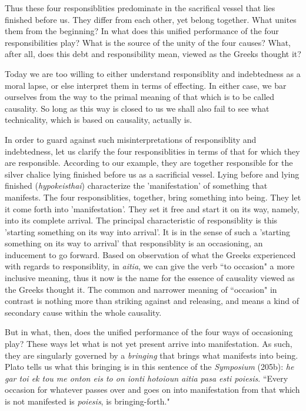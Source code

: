 \documentclass[12pt]{article}
\begin{document}
Thus these four responsiblities predominate in the sacrifical vessel that lies finished before us. They differ from each other, yet belong together. What unites them from the beginning? In what does this unified performance of the four responsibilities play? What is the source of the unity of the four causes? What, after all, does this debt and responsibility mean, viewed as the Greeks thought it? 

Today we are too willing to either understand responsiblity and indebtedness as a moral lapse, or else interpret them in terms of effecting. In either case, we bar ourselves from the way to the primal meaning of that which is to be called causality. So long as this way is closed to us we shall also fail to see what technicality, which is based on causality, actually is.

In order to guard against such misinterpretations of responsiblity and indebtedness, let us clarify the four responsiblities in terms of that for which they are responsible. According to our example, they are together responsible for the silver chalice lying finished before us as a sacrificial vessel. Lying before and lying finished (\textit{hypokeisthai}) characterize the 'manifestation' of something that manifests. The four responsiblities, together, bring something into being. They let it come forth into 'manifestation'. They set it free and start it on its way, namely, into its complete arrival. The principal characteristic of responsiblity is this 'starting something on its way into arrival'. It is in the sense of such a 'starting something on its way to arrival' that responsiblity is an occasioning, an inducement to go forward. Based on observation of what the Greeks experienced with regards to responsiblity, in \textit{aitia}, we can give the verb ``to occasion" a more inclusive meaning, thus it now is the name for the essence of causality viewed as the Greeks thought it. The common and narrower meaning of ``occasion" in contrast is nothing more than striking against and releasing, and means a kind of secondary cause within the whole causality.

But in what, then, does the unified performance of the four ways of occasioning play? These ways let what is not yet present arrive into manifestation. As such, they are singularly governed by a \textit{bringing} that brings what manifests into being. Plato tells us what this bringing is in this sentence of the \textit{Symposium} (205b): \textit{h{\-e} gar toi ek tou m{\-e} onton eis to on ionti hot{\-o}ioun aitia pasa esti poi{\-e}sis}. ``Every occasion for whatever passes over and goes on into manifestation from that which is not manifested is \textit{poi{\-e}sis}, is bringing-forth."
\end{document}
